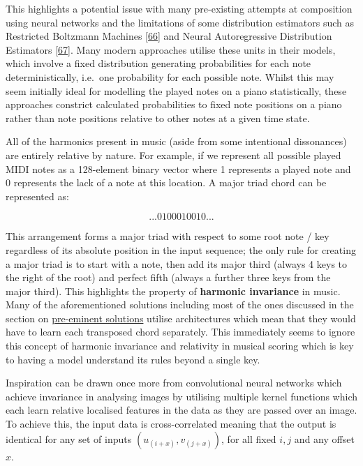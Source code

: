 \documentclass[12pt,]{article}
\begin{document}
This highlights a potential issue with many pre-existing attempts at
composition using neural networks and the limitations of some
distribution estimators such as Restricted Boltzmann Machines
{[}\protect\hyperlink{ref-sutskever2009recurrent}{66}{]} and Neural
Autoregressive Distribution Estimators
{[}\protect\hyperlink{ref-uria2016neural}{67}{]}. Many modern approaches
utilise these units in their models, which involve a fixed distribution
generating probabilities for each note deterministically, i.e.~one
probability for each possible note. Whilst this may seem initially ideal
for modelling the played notes on a piano statistically, these
approaches constrict calculated probabilities to fixed note positions on
a piano rather than note positions relative to other notes at a given
time state.

All of the harmonics present in music (aside from some intentional
dissonances) are entirely relative by nature. For example, if we
represent all possible played MIDI notes as a 128-element binary vector
where 1 represents a played note and 0 represents the lack of a note at
this location. A major triad chord can be represented as:

\[... 0100010010 ...\]

This arrangement forms a major triad with respect to some root note /
key regardless of its absolute position in the input sequence; the only
rule for creating a major triad is to start with a note, then add its
major third (always 4 keys to the right of the root) and perfect fifth
(always a further three keys from the major third). This highlights the
property of \textbf{harmonic invariance} in music. Many of the
aforementioned solutions including most of the ones discussed in the
section on \protect\hyperlink{competitiveexistingsolutions}{pre-eminent
solutions} utilise architectures which mean that they would have to
learn each transposed chord separately. This immediately seems to ignore
this concept of harmonic invariance and relativity in musical scoring
which is key to having a model understand its rules beyond a single key.

Inspiration can be drawn once more from convolutional neural networks
which achieve invariance in analysing images by utilising multiple
kernel functions which each learn relative localised features in the
data as they are passed over an image. To achieve this, the input data
is cross-correlated meaning that the output is identical for any set of
inputs \((u_{(i + x)}, v_{(j+x)})\), for all fixed \(i,j\) and any
offset \(x\).
\end{document}
